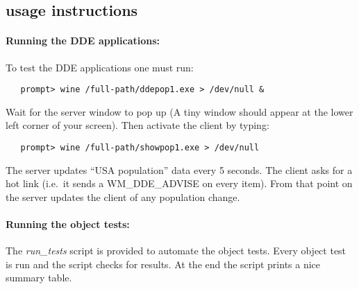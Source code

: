 \subsection{usage instructions}

\paragraph{Running the DDE applications:}
To test the DDE applications one must run:
\begin{verbatim}
   prompt> wine /full-path/ddepop1.exe > /dev/null &
\end{verbatim}
Wait for the server window to pop up (A tiny window should appear at
the lower left corner of your screen). Then activate the client by
typing: 
\begin{verbatim}
   prompt> wine /full-path/showpop1.exe > /dev/null 
\end{verbatim}
The server updates ``USA population'' data every 5 seconds. The client
asks for a hot link (i.e.\ it sends a WM\_DDE\_ADVISE on every
item). From that point on the server updates the client of any
population change.


\paragraph{Running the object tests:}
The {\em run\_tests}{} script is provided to automate the object
tests. Every object test is run and the script checks for results. At
the end the script prints a nice summary table.

